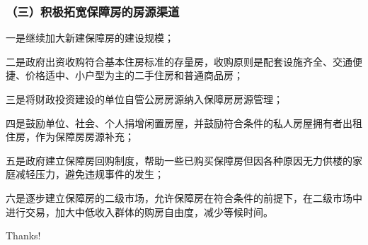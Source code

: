 \documentclass[aspectratio=169, 12pt]{beamer}
\begin{document}
\begin{frame}[plain]
    \frametitle{（三）积极拓宽保障房的房源渠道}
    一是继续加大新建保障房的建设规模；
    \par
    二是政府出资收购符合基本住房标准的存量房，收购原则是配套设施齐全、交通便捷、价格适中、小户型为主的二手住房和普通商品房；
    \par
    三是将财政投资建设的单位自管公房房源纳入保障房房源管理；
    \par
    四是鼓励单位、社会、个人捐增闲置房屋，并鼓励符合条件的私人房屋拥有者出租住房，作为保障房房源补充；
    \par
    五是政府建立保障房回购制度，帮助一些已购买保障房但因各种原因无力供楼的家庭减轻压力，避免违规事件的发生；
    \par
    六是逐步建立保障房的二级市场，允许保障房在符合条件的前提下，在二级市场中进行交易，加大中低收入群体的购房自由度，减少等候时间。
\end{frame}

\begin{frame}[standout]
    \begin{center}
        {\Huge\calligra Thanks!}
      \end{center}
\end{frame}
\end{document}
